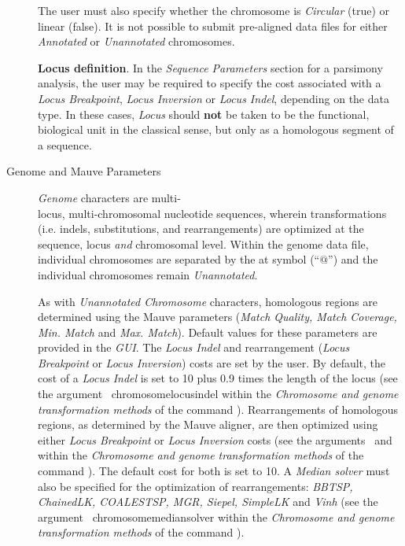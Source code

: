 \begin{description}
\indent The user must also specify whether the chromosome is
\emph{Circular} (true) or linear (false).  It is not possible to
submit pre-aligned data files for either \emph{Annotated} or
\emph{Unannotated} chromosomes.


\begin{statement}
\textbf{Locus definition}. In the \emph{Sequence Parameters} section
for a parsimony analysis, the user may be required to specify the
cost associated with a \emph{Locus Breakpoint}, \emph{Locus Inversion}
or \emph{Locus Indel}, depending on the data type. In these cases,
\emph{Locus} should \textbf{not} be taken to be the functional,
biological unit in the classical sense, but only as a homologous
segment of a sequence.  \end{statement}

\item [Genome and Mauve Parameters] \emph{Genome} characters are
multi- \\locus, multi-chromosomal nucleotide sequences, wherein
transformations (i.e. indels, substitutions, and rearrangements)
are optimized at the sequence, locus \emph{and} chromosomal level.
Within the genome data file, individual chromosomes are separated
by the at symbol (``$@$'') and the individual chromosomes remain
\emph{Unannotated}.

\indent As with \emph{Unannotated Chromosome} characters, homologous
regions are determined using the Mauve parameters (\emph{Match
Quality, Match Coverage, Min. Match} and \emph {Max. Match}).
Default values for these parameters are provided in the \emph{GUI}.
The \emph{Locus Indel} and rearrangement (\emph{Locus Breakpoint}
or \emph{Locus Inversion}) costs are set by the user. By default,
the cost of a \emph{Locus Indel} is  set to 10 plus 0.9 times the
length of the locus (see the argument~
{chromosomelocusindel} within the \emph{Chromosome and genome
transformation methods} of the command ).
Rearrangements of homologous regions, as determined by the Mauve
aligner, are then optimized using either \emph{Locus Breakpoint}
or \emph{Locus Inversion} costs  (see the
arguments~
and~ within the
\emph{Chromosome and genome transformation methods} of the command
).  The default cost for both is set to 10.
A \emph{Median solver} must also be specified for the optimization
of rearrangements: \emph{BBTSP, ChainedLK, COALESTSP, MGR, Siepel,
SimpleLK} and \emph{Vinh} (see the argument~
{chromosomemediansolver} within the \emph{Chromosome and genome
transformation methods} of the command ).


\end{description}
